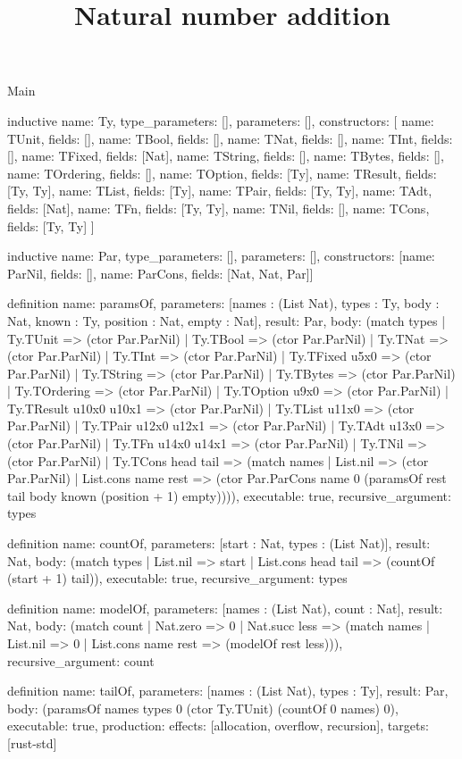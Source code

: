 \begin{lexlean}{Main}
\title{Natural number addition}
\begin{semanticmodule}
inductive{
  name: Ty,
  type_parameters: [],
  parameters: [],
  constructors: [
    {name: TUnit, fields: []},
    {name: TBool, fields: []},
    {name: TNat, fields: []},
    {name: TInt, fields: []},
    {name: TFixed, fields: [Nat]},
    {name: TString, fields: []},
    {name: TBytes, fields: []},
    {name: TOrdering, fields: []},
    {name: TOption, fields: [Ty]},
    {name: TResult, fields: [Ty, Ty]},
    {name: TList, fields: [Ty]},
    {name: TPair, fields: [Ty, Ty]},
    {name: TAdt, fields: [Nat]},
    {name: TFn, fields: [Ty, Ty]},
    {name: TNil, fields: []},
    {name: TCons, fields: [Ty, Ty]}
  ]
}

inductive{
  name: Par,
  type_parameters: [],
  parameters: [],
  constructors: [{name: ParNil, fields: []}, {name: ParCons, fields: [Nat, Nat, Par]}]
}

definition{
  name: paramsOf,
  parameters: [names : (List Nat), types : Ty, body : Nat, known : Ty, position : Nat, empty : Nat],
  result: Par,
  body: (match types
    | Ty.TUnit => (ctor Par.ParNil)
    | Ty.TBool => (ctor Par.ParNil)
    | Ty.TNat => (ctor Par.ParNil)
    | Ty.TInt => (ctor Par.ParNil)
    | Ty.TFixed u5x0 => (ctor Par.ParNil)
    | Ty.TString => (ctor Par.ParNil)
    | Ty.TBytes => (ctor Par.ParNil)
    | Ty.TOrdering => (ctor Par.ParNil)
    | Ty.TOption u9x0 => (ctor Par.ParNil)
    | Ty.TResult u10x0 u10x1 => (ctor Par.ParNil)
    | Ty.TList u11x0 => (ctor Par.ParNil)
    | Ty.TPair u12x0 u12x1 => (ctor Par.ParNil)
    | Ty.TAdt u13x0 => (ctor Par.ParNil)
    | Ty.TFn u14x0 u14x1 => (ctor Par.ParNil)
    | Ty.TNil => (ctor Par.ParNil)
    | Ty.TCons head tail => (match names
      | List.nil => (ctor Par.ParNil)
      | List.cons name rest => (ctor Par.ParCons name 0 (paramsOf rest tail body known (position + 1) empty)))),
  executable: true,
  recursive_argument: types
}

definition{
  name: countOf,
  parameters: [start : Nat, types : (List Nat)],
  result: Nat,
  body: (match types | List.nil => start | List.cons head tail => (countOf (start + 1) tail)),
  executable: true,
  recursive_argument: types
}

definition{
  name: modelOf,
  parameters: [names : (List Nat), count : Nat],
  result: Nat,
  body: (match count
    | Nat.zero => 0
    | Nat.succ less => (match names | List.nil => 0 | List.cons name rest => (modelOf rest less))),
  recursive_argument: count
}

definition{
  name: tailOf,
  parameters: [names : (List Nat), types : Ty],
  result: Par,
  body: (paramsOf names types 0 (ctor Ty.TUnit) (countOf 0 names) 0),
  executable: true,
  production: {effects: [allocation, overflow, recursion], targets: [rust-std]}
}
\end{semanticmodule}
\end{lexlean}
